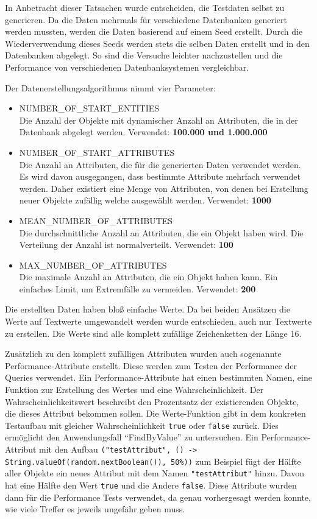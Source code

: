 In Anbetracht dieser Tatsachen wurde entscheiden, die Testdaten selbst zu generieren. Da die Daten mehrmals für verschiedene Datenbanken generiert werden mussten, werden die Daten basierend auf einem Seed erstellt. Durch die Wiederverwendung dieses Seeds werden stets die selben Daten erstellt und in den Datenbanken abgelegt. So sind die Versuche leichter nachzustellen und die Performance von verschiedenen Datenbanksystemen vergleichbar.

Der Datenerstellungsalgorithmus nimmt vier Parameter:
\begin{itemize}
\item NUMBER{\_}OF{\_}START{\_}ENTITIES \\
Die Anzahl der Objekte mit dynamischer Anzahl an Attributen, die in der Datenbank abgelegt werden. Verwendet: \textbf{100.000 und 1.000.000}
\item NUMBER{\_}OF{\_}START{\_}ATTRIBUTES \\
Die Anzahl an Attributen, die für die generierten Daten verwendet werden. Es wird davon ausgegangen, dass bestimmte Attribute mehrfach verwendet werden. Daher existiert eine Menge von Attributen, von denen bei Erstellung neuer Objekte zufällig welche ausgewählt werden. Verwendet: \textbf{1000}
\item MEAN{\_}NUMBER{\_}OF{\_}ATTRIBUTES \\
Die durchschnittliche Anzahl an Attributen, die ein Objekt haben wird. Die Verteilung der Anzahl ist normalverteilt. Verwendet: \textbf{100}
\item MAX{\_}NUMBER{\_}OF{\_}ATTRIBUTES \\
Die maximale Anzahl an Attributen, die ein Objekt haben kann. Ein einfaches Limit, um Extremfälle zu vermeiden. Verwendet: \textbf{200}
\end{itemize}

Die erstellten Daten haben bloß einfache Werte. Da bei beiden Ansätzen die Werte auf Textwerte umgewandelt werden wurde entschieden, auch nur Textwerte zu erstellen. Die Werte sind alle komplett zufällige Zeichenketten der Länge 16. 

Zusätzlich zu den komplett zufälligen Attributen wurden auch sogenannte Performance-Attribute erstellt. Diese werden zum Testen der Performance der Queries verwendet. Ein Performance-Attribute hat einen bestimmten Namen, eine Funktion zur Erstellung des Wertes und eine Wahrscheinlichkeit. Der Wahrscheinlichkeitswert beschreibt den Prozentsatz der existierenden Objekte, die dieses Attribut bekommen sollen. Die Werte-Funktion gibt in dem konkreten Testaufbau mit gleicher Wahrscheinlichkeit \lstinline|true| oder \lstinline|false| zurück. Dies ermöglicht den Anwendungsfall ``FindByValue'' zu untersuchen. Ein Performance-Attribut mit den Aufbau \lstinline|("testAttribut", () -> String.valueOf(random.nextBoolean()), 50%))| zum Beispiel fügt der Hälfte aller Objekte ein neues Attribut mit dem Namen \lstinline|"testAttribut"| hinzu. Davon hat eine Hälfte den Wert \lstinline|true| und die Andere \lstinline|false|.
Diese Attribute wurden dann für die Performance Tests verwendet, da genau vorhergesagt werden konnte, wie viele Treffer es jeweils ungefähr geben muss.


